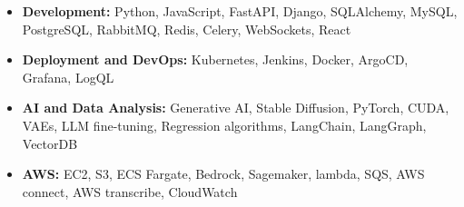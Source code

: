 
\begin{cvskills}

\setlength{\leftmargini}{1em}
\begin{itemize}
    \item \textbf{Development:} Python, JavaScript, FastAPI, Django, SQLAlchemy, MySQL, PostgreSQL, RabbitMQ, Redis, Celery, WebSockets, React
    \item \textbf{Deployment and DevOps:} Kubernetes, Jenkins, Docker, ArgoCD, Grafana, LogQL
    \item \textbf{AI and Data Analysis:} Generative AI, Stable Diffusion, PyTorch, CUDA, VAEs, LLM fine-tuning, Regression algorithms, LangChain, LangGraph, VectorDB
    \item \textbf{AWS:} EC2, S3, ECS Fargate, Bedrock, Sagemaker, lambda, SQS, AWS connect, AWS transcribe, CloudWatch
\end{itemize}

\end{cvskills}
